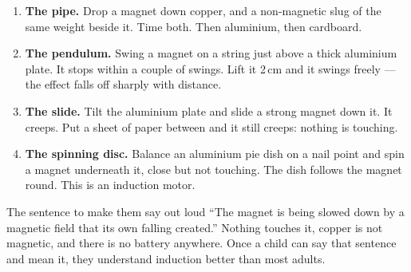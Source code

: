 \begin{enumerate}
\item \textbf{The pipe.} Drop a magnet down copper, and a non-magnetic slug of the same weight beside it. Time both. Then aluminium, then cardboard.
\item \textbf{The pendulum.} Swing a magnet on a string just above a thick aluminium plate. It stops within a couple of swings. Lift it 2\,cm and it swings freely --- the effect falls off sharply with distance.
\item \textbf{The slide.} Tilt the aluminium plate and slide a strong magnet down it. It creeps. Put a sheet of paper between and it still creeps: nothing is touching.
\item \textbf{The spinning disc.} Balance an aluminium pie dish on a nail point and spin a magnet underneath it, close but not touching. The dish follows the magnet round. This is an induction motor.
\end{enumerate}

\begin{telosfacts}[0.22]
\end{telosfacts}

\begin{telospanel}{The sentence to make them say out loud}
``The magnet is being slowed down by a magnetic field that its own falling
created.'' Nothing touches it, copper is not magnetic, and there is no battery
anywhere. Once a child can say that sentence and mean it, they understand
induction better than most adults.
\end{telospanel}
\lowvoltagenote

